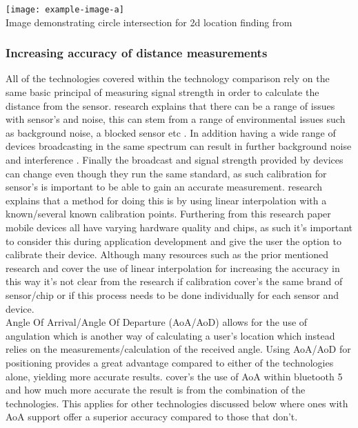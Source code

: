 \begin{center}
	\texttt{[image: example-image-a]}\\
	Image demonstrating circle intersection for 2d location finding from \citetemp
\end{center}

\subsubsection{Increasing accuracy of distance measurements}
All of the technologies covered within the technology comparison rely on the same basic principal of measuring signal strength in order to calculate the distance from the sensor. \citetemp research explains that there can be a range of issues with sensor's and noise, this can stem from a range of environmental issues such as background noise, a blocked sensor etc \citetemp. In addition having a wide range of devices broadcasting in the same spectrum can result in further background noise and interference \citetemp. Finally the broadcast and signal strength provided by devices can change even though they run the same standard, as such calibration for sensor's is important to be able to gain an accurate measurement. \citetemp research explains that a method for doing this is by using linear interpolation with a known/several known calibration points. Furthering from this research paper mobile devices all have varying hardware quality and chips, as such it's important to consider this during application development and give the user the option to calibrate their device. Although many resources such as the prior mentioned research and \citetemp cover the use of linear interpolation for increasing the accuracy in this way it's not clear from the research if calibration cover's the same brand of sensor/chip or if this process needs to be done individually for each sensor and device.\\ 

Angle Of Arrival/Angle Of Departure (AoA/AoD) allows for the use of angulation which is another way of calculating a user's location which instead relies on the measurements/calculation of the received angle. Using AoA/AoD for positioning provides a great advantage compared to either of the technologies alone, yielding more accurate results. \citetemp cover's the use of AoA within bluetooth 5 and how much more accurate the result is from the combination of the technologies. This applies for other technologies discussed below where ones with AoA support offer a superior accuracy compared to those that don't.


